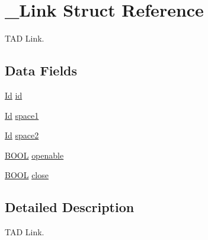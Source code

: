 \hypertarget{struct___link}{\section{\+\_\+\+Link Struct Reference}
\label{struct___link}
}


T\+A\+D Link.  


\subsection*{Data Fields}
\begin{DoxyCompactItemize}
\item 
\hyperlink{_types_8h_a845e604fb28f7e3d97549da3448149d3}{Id} \hyperlink{struct___link_a150a709e86e7134d17cd063de6810b6c}{id}
\item 
\hyperlink{_types_8h_a845e604fb28f7e3d97549da3448149d3}{Id} \hyperlink{struct___link_a601a3f7abdc7f1f82ca2dae2ba31aae6}{space1}
\item 
\hyperlink{_types_8h_a845e604fb28f7e3d97549da3448149d3}{Id} \hyperlink{struct___link_a37b33800211b5ae4d837d1093aa4b3ae}{space2}
\item 
\hyperlink{_types_8h_a3e5b8192e7d9ffaf3542f1210aec18dd}{B\+O\+O\+L} \hyperlink{struct___link_a0f515213497308c25d1d4b405bee4f9b}{openable}
\item 
\hyperlink{_types_8h_a3e5b8192e7d9ffaf3542f1210aec18dd}{B\+O\+O\+L} \hyperlink{struct___link_a166f8d7959390eedc535f36c6176729c}{close}
\end{DoxyCompactItemize}


\subsection{Detailed Description}
T\+A\+D Link. 


\begin{DoxyItemize}
\item 
\end{DoxyItemize}

